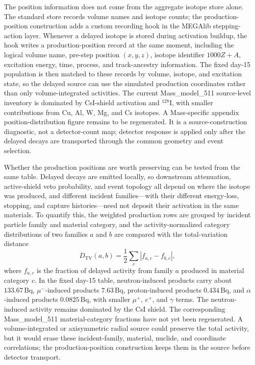 \documentclass[11pt]{article}
\begin{document}
The position information does not come from the aggregate isotope store alone.
The standard store records volume names and isotope counts; the
production-position construction adds a custom recording hook in the MEGAlib
stepping-action layer. Whenever a delayed isotope is stored during activation
buildup, the hook writes a production-position record at the same moment,
including the logical volume name, pre-step position $(x,y,z)$, isotope
identifier $1000Z+A$, excitation energy, time, process, and track-ancestry
information. The fixed day-15 population is then matched to these records by
volume, isotope, and excitation state, so the delayed source can use the
simulated production coordinates rather than only volume-integrated activities.
The current Mass\_model\_511 source-level inventory is dominated by CsI-shield
activation and $^{128}$I, with smaller contributions from Cu, Al, W, Mg, and
Cs isotopes. A Mass-specific appendix position-distribution figure remains to
be regenerated. It is a source-construction diagnostic, not a detector-count
map; detector response is applied only after the delayed
decays are transported through the common geometry and event selection.

Whether the production positions are worth preserving can be tested from the
same table. Delayed decays are emitted locally, so downstream attenuation,
active-shield veto probability, and event topology all depend on where the
isotope was produced, and different incident families---with their different
energy-loss, stopping, and capture histories---need not deposit their
activation in the same materials. To quantify this, the weighted production
rows are grouped by incident particle family and material category, and the
activity-normalized category distributions of two families $a$ and $b$ are
compared with the total-variation distance
\begin{equation}
  D_{\mathrm{TV}}(a,b) =
  \frac{1}{2}\sum_c \left| f_{a,c} - f_{b,c} \right| ,
\end{equation}
where $f_{a,c}$ is the fraction of delayed activity from family $a$ produced
in material category $c$. In the fixed day-15 table, neutron-induced products
carry about $133.67\,\mathrm{Bq}$, $\mu^-$-induced products $7.63\,\mathrm{Bq}$,
proton-induced products $0.434\,\mathrm{Bq}$, and $\alpha$-induced products
$0.0825\,\mathrm{Bq}$, with smaller $\mu^+$, $e^+$, and $\gamma$ terms. The
neutron-induced activity remains dominated by the CsI shield. The corresponding
Mass\_model\_511 material-category fractions have not yet been regenerated.
A volume-integrated or axisymmetric radial source could preserve the total
activity, but it would erase these incident-family, material, nuclide, and
coordinate correlations; the production-position construction keeps them in
the source before detector transport.
\end{document}
